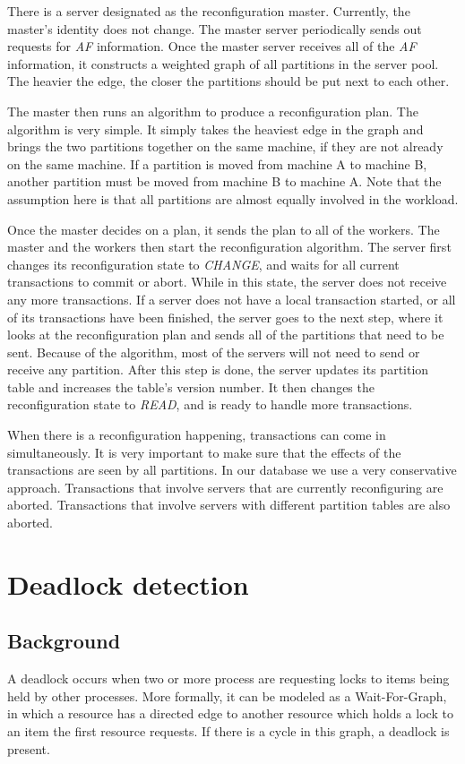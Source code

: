 \documentclass[a4paper, 10pt, notitlepage]{report}
\begin{document}
There is a server designated as the reconfiguration master. Currently, the master's identity does not change. The master server
periodically sends out requests for {\em AF} information. Once the master server receives all of the {\em AF} information, it
constructs a weighted graph of all partitions in the server pool. The heavier the edge, the closer the partitions should be 
put next to each other. 

The master then runs an algorithm to produce a reconfiguration plan. The algorithm is very simple. It simply takes the heaviest
edge in the graph and brings the two partitions together on the same machine, if they are not already on the same machine.
If a partition is moved from machine A to machine B, another partition must be moved from machine B to machine A. Note that the
assumption here is that all partitions are almost equally involved in the workload. 

Once the master decides on a plan, it sends the plan to all of the workers. The master and the workers then start the reconfiguration
algorithm. The server first changes its reconfiguration state to {\em CHANGE}, and waits for all current transactions to commit
or abort. While in this state, the server does not receive any more transactions.
If a server does not have a local transaction started, or all of its transactions have been finished, the server goes
to the next step, where it looks at the reconfiguration plan and sends all of the partitions that need to be sent. Because of the 
algorithm, most of the servers will not need to send or receive any partition. After this step is done, the server updates its
partition table and increases the table's version number. It then changes the reconfiguration state to {\em READ}, and is ready
to handle more transactions.

When there is a reconfiguration happening, transactions can come in simultaneously. It is very important to make sure that the effects
of the transactions are seen by all partitions. In our database we use a very conservative approach. Transactions that involve servers
that are currently reconfiguring are aborted. Transactions that involve servers with different partition tables are also aborted.


\section*{Deadlock detection}
\subsection*{Background}
A deadlock occurs when two or more process are requesting locks to items being held by other processes. More formally, it can be modeled as a Wait-For-Graph, in which a resource has a directed edge to another resource which holds a lock to an item the first resource requests. If there is a cycle in this graph, a deadlock is present.
\end{document}
